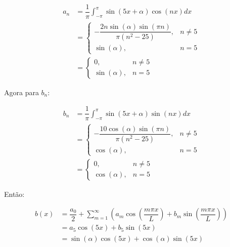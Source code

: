 \documentclass{article}
\begin{document}
\begin{enumerate}
\begin{enumerate}
                        \begin{align*}
                            a_n &= \dfrac{1}{\pi} \int_{-\pi}^{\pi} \sin(5x + \alpha) \cos(nx) dx \\
                            &= \begin{cases}
                                -\dfrac{2n\sin(\alpha)\sin(\pi n)}{\pi(n^2-25)}, & n \ne 5\\
                                \sin(\alpha), & n = 5
                            \end{cases} \\
                            &= \begin{cases}
                                0, & n \ne 5\\
                                \sin(\alpha), & n = 5
                            \end{cases}
                        \end{align*}

                        Agora para $b_n$:

                        \begin{align*}
                            b_n &= \dfrac{1}{\pi} \int_{-\pi}^{\pi} \sin(5x + \alpha) \sin(nx) dx \\
                            &= \begin{cases}
                                -\dfrac{10\cos(\alpha)\sin(\pi n)}{\pi(n^2-25)}, & n \ne 5\\
                                \cos(\alpha), & n = 5
                            \end{cases} \\
                            &= \begin{cases}
                                0, & n \ne 5\\
                                \cos(\alpha), & n = 5
                            \end{cases}
                        \end{align*}

                        Então:
                        
                        \begin{align*}
                            b(x) &= \dfrac{a_0}{2} + \sum_{m=1}^{\infty} \left(a_m \cos \left(\dfrac{m \pi x}{L}\right) + b_m \sin \left(\dfrac{m \pi x}{L}\right)\right) \\
                            &= a_5 \cos(5x) + b_5 \sin(5x) \\
                            &= \sin(\alpha) \cos(5x) + \cos(\alpha) \sin(5x)
                        \end{align*}


\end{enumerate}
\end{enumerate}
\end{document}
